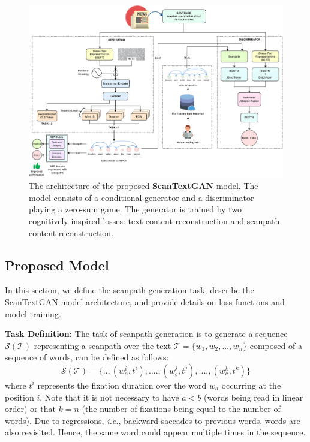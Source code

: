 
\begin{landscape}
\begin{figure}
    \centering
    \includegraphics[width=1.2\textwidth]{images/scanpath_model_6.pdf}
    \caption{The architecture of the proposed \textbf{ScanTextGAN} model. The model consists of a conditional generator and a discriminator playing a zero-sum game. The generator is trained by two cognitively inspired losses: text content reconstruction and scanpath content reconstruction.}
    \label{fig:model} 
\end{figure}
\end{landscape}



\subsection{Proposed Model}
\label{sec:ProposedModel}
In this section, we define the scanpath generation task, describe the ScanTextGAN model architecture, and provide details on loss functions and model training.

\textbf{Task Definition:} The task of scanpath generation is to generate a sequence $\mathcal{S}(\mathcal{T})$ representing a scanpath over the text $\mathcal{T} = \{w_1,w_2,...,w_n\}$ composed of a sequence of words, can be defined as follows:
\begin{equation}
    \mathcal{S(T)} = \{..,(w_a^i,t^i),....,(w_b^j,t^j),....,(w_c^k,t^k)\}
\end{equation}
where $t^i$ represents the fixation duration over the word $w_a$ occurring at the position $i$.  Note that it is not necessary to have $a<b$ (words being read in linear order) or that $k=n$ (the number of fixations being equal to the number of words). Due to regressions, \textit{i.e.}, backward saccades to previous words, words are also revisited. Hence, the same word could appear multiple times in the sequence.

